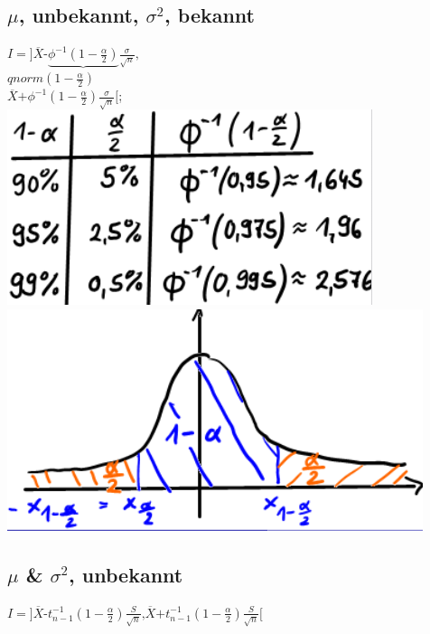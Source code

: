   \subsection{$ \mu $, unbekannt, $ \sigma^{2} $, bekannt}
  $ I = ] \overline{X} \textbf{-} \underbrace{\phi^{-1}( 1-\frac{\alpha}{2} ) } \frac{\sigma}{ \sqrt{n} }\textbf{,} $\\ 
  $ qnorm ( 1-\frac{\alpha}{2} ) $\\
  $ \overline{X} \textbf{+} \phi^{-1} ( 1- \frac{\alpha}{2} ) \frac{\sigma}{ \sqrt{n} } [ $; 
  \includegraphics[scale=0.25]{./pic/QnormTabelle.png}
  \includegraphics[scale=0.25]{./pic/KonfidenzintervallDichtefunktionTabelle.png}

  \subsection{$ \mu $ \& $ \sigma^{2} $, unbekannt }
  $ I = ] \overline{X} \textbf{-} t_{n-1}^{-1} ( 1-\frac{\alpha}{2} ) \frac{S}{ \sqrt{n} } \textbf{,} \overline{X}  \textbf{+} t_{n-1}^{-1} ( 1-\frac{\alpha}{2} )\frac{S}{ \sqrt{n} } [ $
  